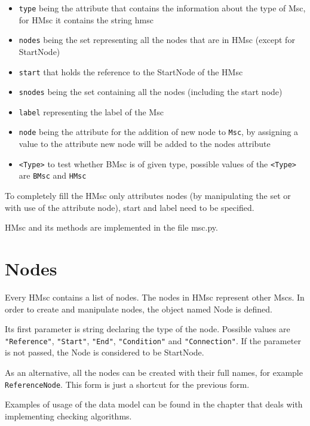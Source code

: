 \documentclass[11pt,oneside]{fithesis2}
\newcommand{\T}[1]{\texttt{#1}}
\newcommand{\ite}[1]{\item{\texttt{#1}}}
\begin{document}
\begin{itemize}
\ite{type} being the attribute that contains the information about the type of Msc, for HMsc it contains the string hmsc
\ite{nodes} being the set representing all the nodes that are in HMsc (except for StartNode)
\ite{start} that holds the reference to the StartNode of the HMsc
\ite{snodes} being the set containing all the nodes (including the start node)
\ite{label} representing the label of the Msc
\ite{node} being the attribute for the addition of new node to \T{Msc}, by assigning a value to the attribute new node will be added to the nodes attribute
\ite{<Type>} to test whether BMsc is of given type, possible values of the \T{<Type>} are \T{BMsc} and \T{HMsc}
\end{itemize}

To completely fill the HMsc only attributes nodes (by manipulating the set or with use of the attribute node), start and label need to be specified.

HMsc and its methods are implemented in the file msc.py.


\section{Nodes}
Every HMsc contains a list of nodes. The nodes in HMsc represent other Mscs. In order to create and manipulate nodes, the object named Node is defined.

Its first parameter is string declaring the type of the node. Possible values are \T{"Reference"}, \T{"Start"}, \T{"End"}, \T{"Condition"} and \T{"Connection"}. If the parameter is not passed, the Node is considered to be StartNode.

As an alternative, all the nodes can be created with their full names, for example \T{ReferenceNode}. This form is just a shortcut for the previous form.

Examples of usage of the data model can be found in the chapter that deals with implementing checking algorithms.
\end{document}
